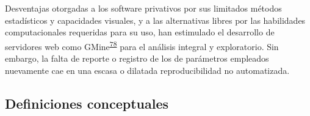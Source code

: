 \documentclass[]{article}
\begin{document}
\begin{enumerate}
\begin{enumerate}
\begin{enumerate}
      Desventajas otorgadas a los software privativos por sus limitados
      métodos estadísticos y capacidades visuales, y a las alternativas
      libres por las habilidades computacionales requeridas para su uso,
      han estimulado el desarrollo de servidores web como
      GMine\textsuperscript{\protect\hyperlink{ref-gmine2016}{78}} para
      el análisis integral y exploratorio. Sin embargo, la falta de
      reporte o registro de los de parámetros empleados nuevamente cae
      en una escasa o dilatada reproducibilidad no automatizada.
    \end{enumerate}
  \end{enumerate}
\end{enumerate}

\subsection{Definiciones conceptuales}\label{definiciones-conceptuales}
\end{document}
